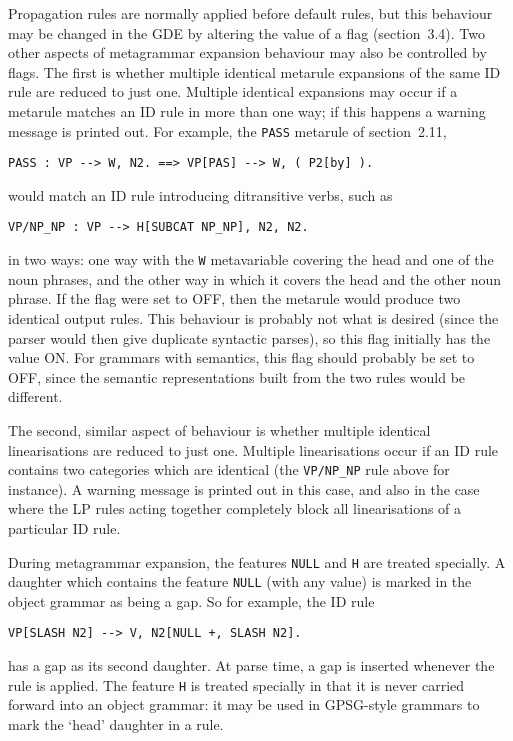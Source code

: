 Propagation rules are normally applied before default rules, but this
behaviour may be changed in the GDE by altering the value of a flag
(section~3.4).  Two other aspects of metagrammar expansion behaviour may
also be controlled by flags. The first is whether multiple identical
metarule expansions of the same ID rule are reduced to just one.
Multiple identical expansions may occur if a metarule matches an ID
rule in more than one way; if this happens a warning message is printed
out. For example, the {\tt PASS} metarule of section~2.11,
\begin{ex}
\begin{verbatim}
PASS : VP --> W, N2. ==> VP[PAS] --> W, ( P2[by] ).
\end{verbatim}
\end{ex}
would match an ID rule introducing ditransitive verbs, such as
\begin{ex}
\begin{verbatim}
VP/NP_NP : VP --> H[SUBCAT NP_NP], N2, N2.
\end{verbatim}
\end{ex}
in two ways: one way with the {\tt W} metavariable covering the head
and one of the noun phrases, and the other way in which it covers the
head and the other noun phrase. If the flag were set to OFF, then the
metarule would produce two identical output rules. This behaviour is
probably not what is desired (since the parser would then give
duplicate syntactic parses), so this flag initially has the value ON.
For grammars with semantics, this flag should probably be set to OFF,
since the semantic representations built from the two rules would
be different.

The second, similar aspect of behaviour is whether multiple identical
linearisations are reduced to just one. Multiple linearisations occur if
an ID rule contains two categories which are identical (the {\tt VP/NP\_NP}
rule above for instance). A warning message is printed out in this
case, and also in the case where the LP rules acting together completely
block all linearisations of a particular ID rule.

During metagrammar expansion, the features {\tt NULL} and {\tt H} are
treated specially. A daughter which contains the feature {\tt NULL} (with
any value) is marked in the object grammar as being a gap. So for example,
the ID rule
\begin{ex}
\begin{verbatim}
VP[SLASH N2] --> V, N2[NULL +, SLASH N2].
\end{verbatim}
\end{ex}
has a gap as its second daughter. At parse time, a gap is inserted whenever
the rule is applied. The feature {\tt H} is treated specially in that it is
never carried forward into an object grammar: it may be used in
GPSG-style grammars to mark the `head' daughter in a rule.


